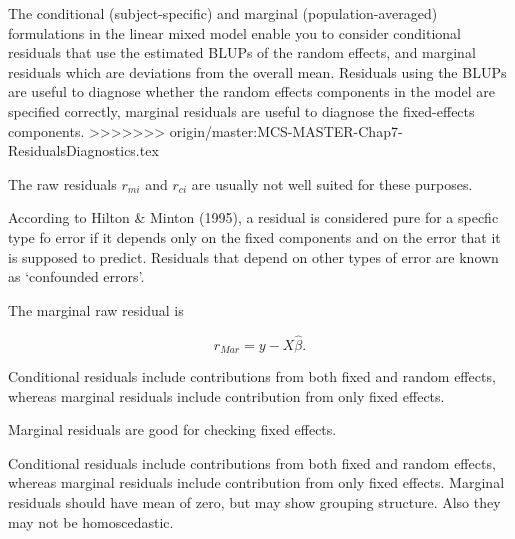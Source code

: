 \documentclass[12pt, a4paper]{report}
\theoremstyle{plain}
\theoremstyle{definition}
\theoremstyle{remark}
\begin{document}
The conditional (subject-specific) and marginal (population-averaged) formulations in the linear mixed model enable you to consider conditional residuals that use the estimated BLUPs of the random effects, and marginal residuals which are deviations from the overall mean. Residuals using the BLUPs are useful to diagnose whether the random effects components in the model are specified correctly, marginal residuals are useful to diagnose the fixed-effects components.	
>>>>>>> origin/master:MCS-MASTER-Chap7-ResidualsDiagnostics.tex
	
	The raw residuals $r_{mi}$ and $r_{ci}$ are usually not well suited for these purposes.
	


	
	
	According to Hilton \& Minton (1995), a residual is considered pure for a specfic type fo error
	if it depends only on the fixed components and on the error that it is supposed to predict.
	Residuals that depend on other types of error are known as `confounded errors'.
	
	
The marginal raw residual is

\[ r_{Mar} = y - X \hat{\beta}. \]

	
	Conditional residuals include contributions from both fixed and random effects, whereas marginal residuals include contribution from only fixed effects.
	
Marginal residuals are good for checking fixed effects.	


Conditional residuals include contributions from both fixed and random effects, whereas marginal residuals include contribution from only fixed effects. Marginal residuals should have mean of zero, but may show grouping structure. Also they may not be homoscedastic.
\end{document}
